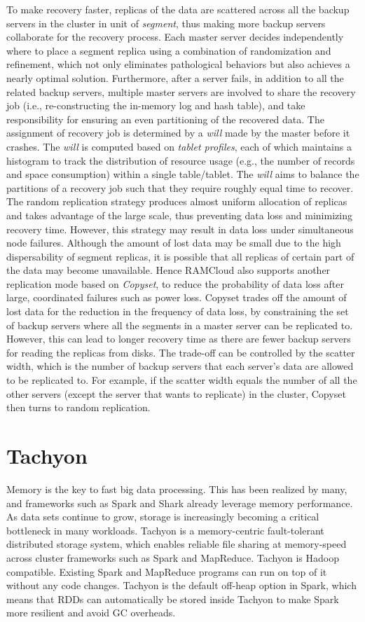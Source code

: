 \documentclass[twocolumn]{article}
\begin{document}
To make recovery faster, replicas of the data are scattered across all
the backup servers in the cluster in unit of \emph{segment}, thus making
more backup servers collaborate for the recovery process. Each master
server decides independently where to place a segment replica using a
combination of randomization and refinement, which not only eliminates
pathological behaviors but also achieves a nearly optimal solution.
Furthermore, after a server fails, in addition to all the related backup
servers, multiple master servers are involved to share the recovery job
(i.e., re-constructing the in-memory log and hash table), and take
responsibility for ensuring an even partitioning of the recovered data.
The assignment of recovery job is determined by a \emph{will} made by
the master before it crashes. The \emph{will} is computed based on
\emph{tablet profiles}, each of which maintains a histogram to track the
distribution of resource usage (e.g., the number of records and space
consumption) within a single table/tablet. The \emph{will} aims to
balance the partitions of a recovery job such that they require roughly
equal time to recover.
The random replication strategy produces almost uniform allocation of
replicas and takes advantage of the large scale, thus preventing data
loss and minimizing recovery
time. However,
this strategy may result in data loss under simultaneous node failures. 
Although the amount of lost data may
be small due to the high dispersability of segment replicas, it is
possible that all replicas of certain part of the data may become
unavailable. 
Hence RAMCloud
also supports another replication mode based on \emph{Copyset}, to reduce the probability of data loss
after large, coordinated failures such as power loss. Copyset trades off
the amount of lost data for the reduction in the frequency of data loss,
by constraining the set of backup servers where all the segments in a
master server can be replicated to. However, this can lead to longer
recovery time as there are fewer backup servers for reading the replicas
from disks. The trade-off can be controlled by the scatter width, which
is the number of backup servers that each server's data are allowed to
be replicated to. For example, if the scatter width equals the number of
all the other servers (except the server that wants to replicate) in the
cluster, Copyset then turns to random replication.

\section{Tachyon}
Memory is the key to fast big data processing. This has been realized by many, and frameworks such as Spark and Shark already leverage memory performance. As data sets continue to grow, storage is increasingly becoming a critical bottleneck in many workloads.
Tachyon is a memory-centric fault-tolerant distributed storage system, which enables reliable file sharing at memory-speed across cluster frameworks such as Spark and MapReduce. 
Tachyon is Hadoop compatible. Existing Spark and MapReduce programs can run on top of it without any code changes. Tachyon is the default off-heap option in Spark, which means that RDDs can automatically be stored inside Tachyon to make Spark more resilient and avoid GC overheads. 



\end{document}
